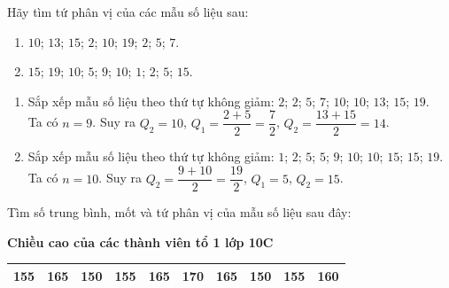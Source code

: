 \begin{bt}%
	Hãy tìm tứ phân vị của các mẫu số liệu sau:
	\begin{enumerate}
		\item[a)] $10$; $13$; $15$; $2$; $10$; $19$; $2$; $5$; $7$.
		\item[b)] $15$; $19$; $10$; $5$; $9$; $10$; $1$; $2$; $5$; $15$.
	\end{enumerate}	
	\loigiai
	{
		\begin{enumerate}
			\item[a)] Sắp xếp mẫu số liệu theo thứ tự không giảm:  $2$; $2$; $5$; $7$; $10$; $10$; $13$; $15$; $19$. \\
			Ta có $n=9$. Suy ra $Q_2=10$, $Q_1=\dfrac{2+5}{2}=\dfrac{7}{2}$, $Q_2=\dfrac{13+15}{2}=14$.
			
			\item[b)] Sắp xếp mẫu số liệu theo thứ tự không giảm:  $1$; $2$; $5$; $5$; $9$; $10$; $10$; $15$; $15$; $19$.\\
			Ta có $n=10$. Suy ra $Q_2=\dfrac{9+10}{2}=\dfrac{19}{2}$, $Q_1=5$, $Q_2=15$.
		\end{enumerate}			
	}
\end{bt}

\begin{bt}%
	Tìm số trung bình, mốt và tứ phân vị của mẫu số liệu sau đây:
	\begin{center}
		\bf Chiều cao của các thành viên tổ 1 lớp 10C
		\begin{tabular}{|c|c|c|c|c|c|c|c|c|c|}
			\hline
			155 & 165 & 150 & 155 & 165 & 170 & 165 & 150 & 155 & 160 \\
			\hline
		\end{tabular}
	\end{center}
\end{bt}

